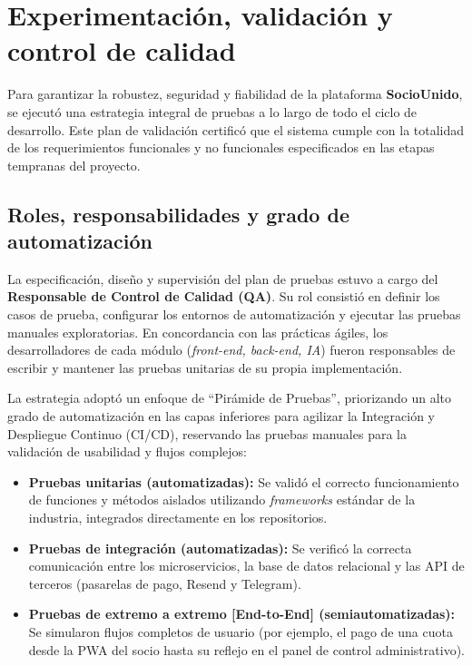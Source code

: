 \section{Experimentación, validación y control de calidad}

Para garantizar la robustez, seguridad y fiabilidad de la plataforma \textbf{SocioUnido}, se ejecutó una estrategia integral de pruebas a lo largo de todo el ciclo de desarrollo. Este plan de validación certificó que el sistema cumple con la totalidad de los requerimientos funcionales y no funcionales especificados en las etapas tempranas del proyecto.

\subsection{Roles, responsabilidades y grado de automatización}

La especificación, diseño y supervisión del plan de pruebas estuvo a cargo del \textbf{Responsable de Control de Calidad (QA)}. Su rol consistió en definir los casos de prueba, configurar los entornos de automatización y ejecutar las pruebas manuales exploratorias. En concordancia con las prácticas ágiles, los desarrolladores de cada módulo (\textit{front-end, back-end, IA}) fueron responsables de escribir y mantener las pruebas unitarias de su propia implementación.

La estrategia adoptó un enfoque de ``Pirámide de Pruebas'', priorizando un alto grado de automatización en las capas inferiores para agilizar la Integración y Despliegue Continuo (CI/CD), reservando las pruebas manuales para la validación de usabilidad y flujos complejos:

\begin{itemize}
    \item \textbf{Pruebas unitarias (automatizadas):} Se validó el correcto funcionamiento de funciones y métodos aislados utilizando \textit{frameworks} estándar de la industria, integrados directamente en los repositorios.
    \item \textbf{Pruebas de integración (automatizadas):} Se verificó la correcta comunicación entre los microservicios, la base de datos relacional y las API de terceros (pasarelas de pago, Resend y Telegram).
    \item \textbf{Pruebas de extremo a extremo [End-to-End] (semiautomatizadas):} Se simularon flujos completos de usuario (por ejemplo, el pago de una cuota desde la PWA del socio hasta su reflejo en el panel de control administrativo).
\end{itemize}

